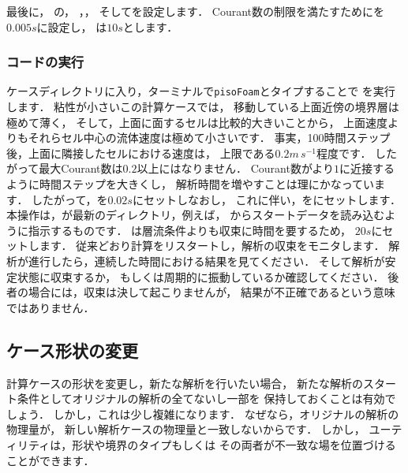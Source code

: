 最後に，
%
%
の，
，，
そしてを設定します．
Courant数の制限を満たすためにを$0.005\unit{s}$に設定し，
は$10\unit{s}$とします．

\subsubsection{コードの実行}
\label{sssec:2.1.8.2}
ケースディレクトリに入り，ターミナルで\texttt{pisoFoam}とタイプすることで
を実行します．
粘性が小さいこの計算ケースでは，
移動している上面近傍の境界層は極めて薄く，
そして，上面に面するセルは比較的大きいことから，
上面速度よりもそれらセル中心の流体速度は極めて小さいです．
事実，100時間ステップ後，上面に隣接したセルにおける速度は，
上限である$0.2\unit{m\,s^{-1}}$程度です．
したがって最大Courant数は$0.2$以上にはなりません．
Courant数がより$1$に近接するように時間ステップを大きくし，
解析時間を増やすことは理にかなっています．
したがって，を$0.02\unit{s}$にセットしなおし，
これに伴い，をにセットします．
本操作は，が最新のディレクトリ，例えば，
からスタートデータを読み込むように指示するものです．
は層流条件よりも収束に時間を要するため，
$20\unit{s}$にセットします．
従来どおり計算をリスタートし，解析の収束をモニタします．
解析が進行したら，連続した時間における結果を見てください．
そして解析が安定状態に収束するか，
もしくは周期的に振動しているか確認してください．
後者の場合には，収束は決して起こりませんが，
結果が不正確であるという意味ではありません．


\subsection{ケース形状の変更}
\label{ssec:2.1.9}
計算ケースの形状を変更し，新たな解析を行いたい場合，
新たな解析のスタート条件としてオリジナルの解析の全てないし一部を
保持しておくことは有効でしょう．
しかし，これは少し複雑になります．
なぜなら，オリジナルの解析の物理量が，
新しい解析ケースの物理量と一致しないからです．
しかし，
%
%
ユーティリティは，形状や境界のタイプもしくは
その両者が不一致な場を位置づけることができます．


